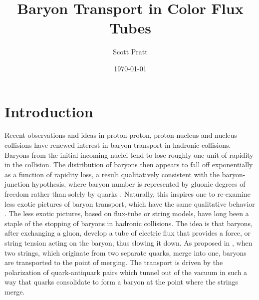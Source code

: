 \documentclass[aps, prc, 12pt, nofootinbib, showpacs, superscriptaddress, tightenlines, groupedaddress]{revtex4-2}
\begin{document}
\title{Baryon Transport in Color Flux Tubes}
\author{Scott Pratt}
\date{\today}

\pacs{}

\begin{abstract}

\end{abstract}

\maketitle

\section{Introduction}

Recent observations and ideas in proton-proton, proton-nucleus and nucleus collisions have renewed interest in baryon transport in hadronic collisions\cite{Brandenburg:2022hrp,STAR:2008med,STAR:2017sal,BRAHMS:2003wwg}. Baryons from the initial incoming nuclei tend to lose roughly one unit of rapidity in the collision. The distribution of baryons then appears to fall off exponentially as a function of rapidity loss, a result qualitatively consistent with the baryon-junction hypothesis, where baryon number is represented by gluonic degrees of freedom rather than solely by quarks \cite{Kharzeev:1996sq}. Naturally, this inspires one to re-examine less exotic pictures of baryon transport, which have the same qualitative behavior \cite{Vance:1997th}. The less exotic pictures, based on flux-tube or string models, have long been a staple of the stopping of baryons in hadronic collisions. The idea is that baryons, after exchanging a gluon, develop a tube of electric flux that provides a force, or string tension acting on the baryon, thus slowing it down. As proposed in \cite{Vance:1997th}, when two strings, which originate from two separate quarks, merge into one, baryons are transported to the point of merging. The transport is driven by the polarization of quark-antiquark pairs which tunnel out of the vacuum in such a way that quarks consolidate to form a baryon at the point where the strings merge.
\end{document}
